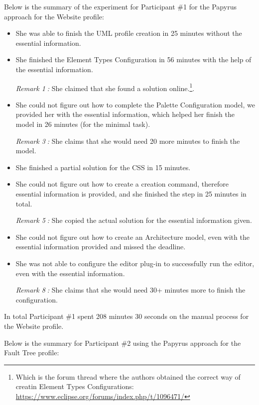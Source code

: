 

Below is the summary of the experiment for Participant \#1 for the Papyrus approach for the Website profile:
\begin{itemize}
	\item She was able to finish the UML profile creation in 25 minutes without the essential information. 
	\item She finished the Element Types Configuration in 56 minutes with the help of the essential information. 
	
	\textit{Remark \textcircled{1}:} She claimed that she found a solution online.\footnote{Which is the forum thread where the authors obtained the correct way of creatin Element Types Configurations: \url{https://www.eclipse.org/forums/index.php/t/1096471/}}.
	\item She could not figure out how to complete the Palette Configuration model, we provided her with the essential information, which helped her finish the model in 26 minutes (for the minimal task). 
	
	\textit{Remark \textcircled{3}:} She claims that she would need 20 more minutes to finish the model.
	\item She finished a partial solution for the CSS in 15 minutes.
	\item She could not figure out how to create a creation command, therefore essential information is provided, and she finished the step in 25 minutes in total.
	
	\textit{Remark \textcircled{5}:} She copied the actual solution for the essential information given.
	\item She could not figure out how to create an Architecture model, even with the essential information provided and missed the deadline.
	\item She was not able to configure the editor plug-in to successfully run the editor, even with the essential information. 
	
	\textit{Remark \textcircled{8}: } She claims that she would need 30+ minutes more to finish the configuration.
\end{itemize}

In total Participant \#1 spent 208 minutes 30 seconds on the manual process for the Website profile.

Below is the summary for Participant \#2 using the Papyrus approach for the Fault Tree profile:

